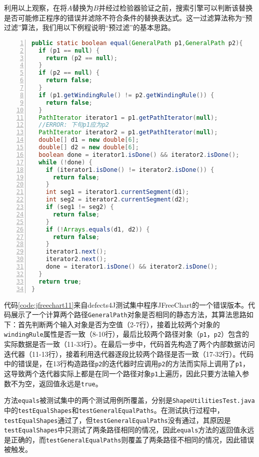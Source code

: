 利用以上观察，在将$A$替换为$B$并经过检验器验证之前，搜索引擎可以判断该替换是否可能修正程序的错误并滤除不符合条件的替换表达式。这一过滤算法称为“预过滤”算法，我们用以下例程说明“预过滤”的基本思路。
\begin{lstlisting}[caption=错误示例 jfreechart-11/ShapeUtilities.java,frame=single,language=Java,numbers=left,basicstyle=\ttfamily\footnotesize,label={code:jfreechart11}]
public static boolean equal(GeneralPath p1,GeneralPath p2){
  if (p1 == null) {
    return (p2 == null);
  }
  if (p2 == null) {
    return false;
  }
  if (p1.getWindingRule() != p2.getWindingRule()) {
    return false;
  }
  PathIterator iterator1 = p1.getPathIterator(null);
  //ERROR: 下句p1应为p2
  PathIterator iterator2 = p1.getPathIterator(null);
  double[] d1 = new double[6];
  double[] d2 = new double[6];
  boolean done = iterator1.isDone() && iterator2.isDone();
  while (!done) {
    if (iterator1.isDone() != iterator2.isDone()) {
      return false;
    }
    int seg1 = iterator1.currentSegment(d1);
    int seg2 = iterator2.currentSegment(d2);
    if (seg1 != seg2) {
      return false;
    }
    if (!Arrays.equals(d1, d2)) {
      return false;
    }
    iterator1.next();
    iterator2.next();
    done = iterator1.isDone() && iterator2.isDone();
  }
  return true;
}
\end{lstlisting}

代码\ref{code:jfreechart11}来自defects4J\cite{Just:2014:DDE:2610384.2628055}测试集中程序JFreeChart的一个错误版本。代码展示了一个计算两个路径\texttt{GeneralPath}对象是否相同的静态方法，其算法思路如下：首先判断两个输入对象是否为空值（2-7行），接着比较两个对象的\texttt{windingRule}属性是否一致（8-10行），最后比较两个路径对象（\texttt{p1}，\texttt{p2}）包含的实际数据是否一致（11-33行）。在最后一步中，代码首先构造了两个内部数据访问迭代器（11-13行），接着利用迭代器逐段比较两个路径是否一致（17-32行）。代码中的错误是，在13行构造路径\texttt{p2}的迭代器时应调用\texttt{p2}的方法而实际上调用了\texttt{p1}，这导致两个迭代器实际上都是在同一个路径对象\texttt{p1}上遍历，因此只要方法输入参数不为空，返回值永远是\texttt{true}。

方法\texttt{equals}被测试集中的两个测试用例所覆盖，分别是\texttt{ShapeUtilitiesTest.java}中的\texttt{testEqualShapes}和\texttt{testGeneralEqualPaths}。在测试执行过程中，\texttt{testEqualShapes}通过了，但\texttt{testGeneralEqualPaths}没有通过，其原因是\texttt{testEqualShapes}中只测试了两条路径相同的情况，因此\texttt{equals}方法的返回值永远是正确的，而\texttt{testGeneralEqualPaths}则覆盖了两条路径不相同的情况，因此错误被触发。

